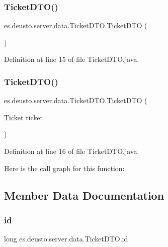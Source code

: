\subsubsection{\texorpdfstring{TicketDTO()}{TicketDTO()}\hspace{0.1cm}{\footnotesize\ttfamily [1/2]}}
{\footnotesize\ttfamily es.\+deusto.\+server.\+data.\+Ticket\+D\+T\+O.\+Ticket\+D\+TO (\begin{DoxyParamCaption}{ }\end{DoxyParamCaption})}



Definition at line 15 of file Ticket\+D\+T\+O.\+java.

\mbox{\label{classes_1_1deusto_1_1server_1_1data_1_1_ticket_d_t_o_ad3d32eef4ab6ad5ea98cc7aa35d3de50}} 
\subsubsection{\texorpdfstring{TicketDTO()}{TicketDTO()}\hspace{0.1cm}{\footnotesize\ttfamily [2/2]}}
{\footnotesize\ttfamily es.\+deusto.\+server.\+data.\+Ticket\+D\+T\+O.\+Ticket\+D\+TO (\begin{DoxyParamCaption}\item[{\mbox{\hyperlink{classes_1_1deusto_1_1server_1_1jdo_1_1_ticket}{Ticket}}}]{ticket }\end{DoxyParamCaption})}



Definition at line 16 of file Ticket\+D\+T\+O.\+java.

Here is the call graph for this function\+:


\subsection{Member Data Documentation}
\mbox{\label{classes_1_1deusto_1_1server_1_1data_1_1_ticket_d_t_o_a1602514fbada31dc44edc01bf359c401}} 
\subsubsection{\texorpdfstring{id}{id}}
{\footnotesize\ttfamily long es.\+deusto.\+server.\+data.\+Ticket\+D\+T\+O.\+id}




